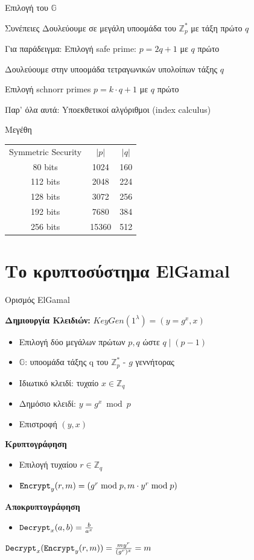 \documentclass[handout]{beamer}
\begin{document}
\begin{frame}{Επιλογή του $\mathbb{G}$}
\begin{small}
\begin{block}{Συνέπειες}
Δουλεύουμε σε μεγάλη υποομάδα του $\mathbb{Z}_p^*$ με τάξη πρώτο $q$
\end{block}
\pause
\begin{block}{Για παράδειγμα:}
Επιλογή safe prime: $p = 2q+1$ με $q$ πρώτο 

Δουλεύουμε στην υποομάδα τετραγωνικών υπολοίπων τάξης $q$

Επιλογή schnorr primes $p = k \cdot q+1$ με $q$ πρώτο

\alert{Παρ' όλα αυτά}: Yποεκθετικοί αλγόριθμοι (index calculus)
\end{block}
\pause
\begin{block}{Μεγέθη}
\begin{tabular}{ccc}
Symmetric Security & $|p|$ & $|q|$ \\
80 bits &  1024 & 160 \\
112 bits & 2048 & 224 \\
128 bits &  3072 & 256 \\
192 bits &  7680 & 384 \\
256 bits &  15360 & 512 \\
\end{tabular}
\end{block}
\end{small}
\end{frame} 

\section{Το κρυπτοσύστημα ElGamal}
\begin{frame}{Ορισμός ElGamal}
 
\textbf{Δημιουργία Κλειδιών:}
$KeyGen(1^{\lambda}) = (y=g^x,x)$
\begin{itemize}
\item Επιλογή δύο μεγάλων πρώτων $p,q$ ώστε $q \mid (p-1)$  
\item $\mathbb{G}$: υποομάδα τάξης q του $\mathbb{Z}_p^*$ - $g$ γεννήτορας 
\item Ιδιωτικό κλειδί: τυχαίο $x \in \mathbb{Z}_q$
\item Δημόσιο κλειδί: $y = g^x \bmod{p}$
\item Επιστροφή $(y,x)$
\end{itemize}
\pause
 
\textbf{Κρυπτογράφηση} 
\begin{itemize}
\item Επιλογή τυχαίου $r \in \mathbb{Z}_q$
\item $\mathtt{Encrypt}_y(r,m) = (g^r \bmod p, m \cdot y^r \bmod p)$
\end{itemize}
\pause

\textbf{Αποκρυπτογράφηση}
\begin{itemize}
\item $\mathtt{Decrypt}_x(a,b) = \frac{b}{a^x}$
\end{itemize} 
\pause
 
 $\mathtt{Decrypt}_x(\mathtt{Encrypt}_y(r,m))= \frac{m y^r}{(g^r)^x} = m$
 
\end{frame}
\end{document}
